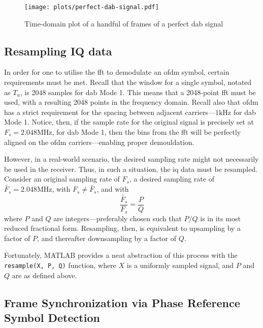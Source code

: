 \documentclass[class=report,11pt,crop=false]{standalone}
\begin{document}
\begin{figure}[htbp]
  \centering
  \captionsetup{type=figure}
  \texttt{[image: plots/perfect-dab-signal.pdf]}
  \caption{Time-domain plot of a handful of frames of a perfect \gls{dab} signal}
  \label{fig:plots/perfect-dab-signal}
\end{figure}

\subsection{Resampling IQ data \label{subsect:dab-proc_iq-resample}}
In order for one to utilise the \gls{fft} to demodulate an \gls{ofdm} symbol, certain requirements must be met. Recall that the window for a single symbol, notated as \(T_u\), is 2048 samples for \gls{dab} Mode 1. This means that a 2048-point \gls{fft} must be used, with a resulting 2048 points in the frequency domain. Recall also that \gls{ofdm} has a strict requirement for the spacing between adjacent carriers---\(1 \si{\kilo \hertz}\) for \gls{dab} Mode 1. Notice, then, if the sample rate for the original signal is precisely set at \(F_s = 2.048 \si{\mega \hertz}\), for \gls{dab} Mode 1, then the bins from the \gls{fft} will be perfectly aligned on the \gls{ofdm} carriers---enabling proper demouldation.

However, in a real-world scenario, the desired sampling rate might not necessarily be used in the receiver. Thus, in such a situation, the \gls{iq} data must be resampled. Consider an original sampling rate of \(F_s\), a desired sampling rate of \(\tilde{F_s} = 2.048 \si{\mega \hertz}\), with \(F_s \ne \tilde{F_s}\), and with
\begin{equation}
  \frac{\tilde{F_s}}{F_s} = \frac{P}{Q}
\end{equation}
where \(P\) and \(Q\) are integers---preferably chosen such that \(P/Q\) is in its most reduced fractional form. Resampling, then, is equivalent to upsampling by a factor of \(P\), and thereafter downsampling by a factor of \(Q\).

Fortunately, MATLAB provides a neat abstraction of this process with the \texttt{resample(X, P, Q)} function, where \(X\) is a uniformly sampled signal, and \(P\) and \(Q\) are as defined above.

\subsection{Frame Synchronization via Phase Reference Symbol Detection \label{subsect:dab-proc_prs-detect}}
\end{document}

